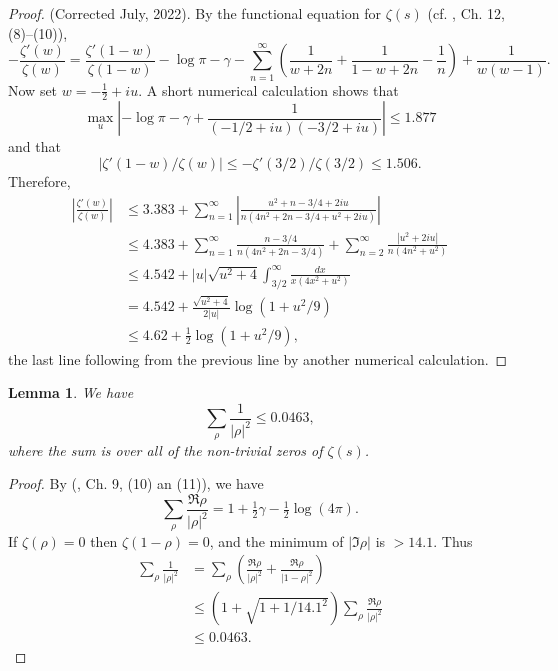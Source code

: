 \documentclass[10pt]{amsart}
\theoremstyle{remark}
\theoremstyle{plain}
\newtheorem{lemma}{Lemma}[section]
\numberwithin{equation}{section}
\theoremstyle{definition}
\def\({\left(}
\def\){\right)}
\newcommand{\rev}[1]{{\color{red}#1}}
\begin{document}
\begin{proof} 
\rev{
(Corrected July, 2022).
By the functional equation for $\zeta(s)$ (cf. \cite{D}, Ch. 12, (8)--(10)), 
\[
-\frac{\zeta'(w)}{\zeta(w)} = \frac{\zeta'(1-w)}{\zeta(1-w)} -
\log \pi - \gamma - \sum_{n=1}^\infty \( \frac{1}{w+2n}+\frac{1}{1-w+2n}
-\frac1{n} \)+\frac{1}{w(w-1)}.
\]
Now set $w=-\frac12 + iu$.  A short numerical calculation shows that
\[
\max_u \left| -\log \pi - \gamma + \frac{1}{(-1/2+iu)(-3/2+iu)} \right| \le 1.877
\]
and that 
\[
|\zeta'(1-w)/\zeta(w)| \le -\zeta'(3/2)/\zeta(3/2) \le 1.506.
\]
Therefore,
\begin{align*}
\left| \frac{\zeta'(w)}{\zeta(w)} \right| &\le 3.383 + \sum_{n=1}^\infty 
\left| \frac{u^2+n-3/4+2iu} {n(4n^2+2n-3/4+u^2+2iu)} \right| \\
&\le 4.383 + \sum_{n=1}^\infty \frac{n-3/4}{n(4n^2+2n-3/4)} +
\sum_{n=2}^\infty \frac{|u^2+2iu|}{n(4n^2+u^2)} \\
&\le 4.542 + |u|\sqrt{u^2+4} \int_{3/2}^\infty \frac{dx}{x(4x^2+u^2)}  \\
&= 4.542 + \frac{\sqrt{u^2+4}}{2|u|} \log (1+u^2/9) \\
&\le 4.62 + \tfrac12\log(1+u^2/9),
\end{align*}
the last line following from the previous line by another numerical calculation.}
\end{proof}

%
%

\begin{lemma} \label{lem:sum rho}
We have
$$
\sum_{\rho} \frac{1}{|\rho|^2} \le 0.0463,
$$
where the sum is over all of the non-trivial zeros of $\zeta(s)$.
\end{lemma}

\begin{proof} By (\cite{D}, Ch. 9, (10) an (11)), we have
$$
\sum_{\rho} \frac{\Re \rho}{|\rho|^2} = 1 + \tfrac12 \gamma - \tfrac12
 \log(4\pi).
$$
If $\zeta(\rho)=0$ then $\zeta(1-\rho)=0$, and the minimum of $|\Im \rho|$
is $>14.1$.  Thus
\begin{align*}
\sum_{\rho} \frac{1}{|\rho|^2} &= \sum_{\rho} \( \frac{\Re \rho}{|\rho|^2}
+\frac{\Re\rho}{|1-\rho|^2} \) \\
&\le \( 1 + \sqrt{1+1/14.1^2} \) \sum_{\rho} \frac{\Re \rho}{|\rho|^2}\\
&\le 0.0463.
\end{align*}
\end{proof}
\end{document}
